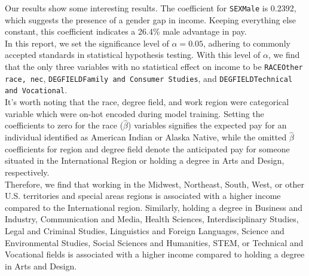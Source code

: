 \documentclass{article}
\begin{document}
\begin{table}[ht]
\end{table}

Our results show some interesting results. The coefficient for \texttt{SEXMale} is 0.2392, which suggests the presence of a gender gap in income.
Keeping everything else constant, this coefficient indicates a 26.4\% male advantage in pay.
\\

In this report, we set the significance level of $\alpha = 0.05$, adhering to commonly accepted standards in statistical hypothesis testing. With this
level of $\alpha$, we find that the only three variables with no statistical effect on income to be \texttt{RACEOther race, nec}, \texttt{DEGFIELDFamily and Consumer Studies}, and \texttt{DEGFIELDTechnical and Vocational}.
\\

It's worth noting that the race, degree field, and work region were categorical variable which were on-hot encoded during model training. Setting the coefficients to zero for the race ($\hat{\beta}$) variables signifies the expected pay for an individual identified as American Indian or Alaska Native, while the omitted $\hat{\beta}$ coefficients for region and degree field denote the anticipated pay for someone situated in the International Region or holding a degree in Arts and Design, respectively.
\\

Therefore, we find that working in the Midwest, Northeast, South, West, or other U.S. territories and special areas regions is associated with a higher income compared to the International region. 
Similarly, holding a degree in Business and Industry, Communication and Media, Health Sciences, Interdisciplinary Studies, Legal and Criminal Studies, Linguistics and Foreign Languages, Science and Environmental Studies, Social Sciences and Humanities, STEM, or Technical and Vocational fields is associated with a higher income compared to holding a degree in Arts and Design.
\\
\end{document}
